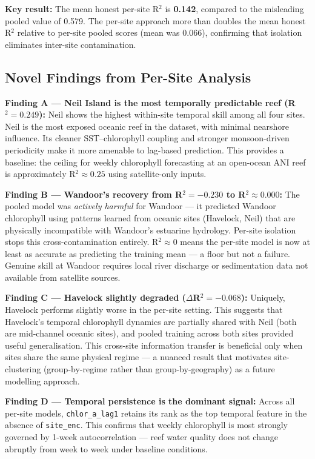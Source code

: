 \documentclass[12pt,a4paper]{report}
\begin{document}
\begin{findingbox}
\textbf{Key result:} The mean honest per-site R$^2$ is \textbf{0.142}, compared to the
misleading pooled value of 0.579. The per-site approach more than doubles the mean
honest R$^2$ relative to per-site pooled scores (mean was 0.066), confirming that
isolation eliminates inter-site contamination.
\end{findingbox}

\subsection{Novel Findings from Per-Site Analysis}

\textbf{Finding A — Neil Island is the most temporally predictable reef (R$^2 = 0.249$):}
Neil shows the highest within-site temporal skill among all four sites. Neil is the
most exposed oceanic reef in the dataset, with minimal nearshore influence. Its cleaner
SST--chlorophyll coupling and stronger monsoon-driven periodicity make it more amenable
to lag-based prediction. This provides a baseline: the ceiling for weekly chlorophyll
forecasting at an open-ocean ANI reef is approximately R$^2 \approx 0.25$ using
satellite-only inputs.

\textbf{Finding B — Wandoor's recovery from R$^2 = -0.230$ to R$^2 \approx 0.000$:}
The pooled model was \textit{actively harmful} for Wandoor — it predicted Wandoor
chlorophyll using patterns learned from oceanic sites (Havelock, Neil) that are
physically incompatible with Wandoor's estuarine hydrology. Per-site isolation stops
this cross-contamination entirely. R$^2 \approx 0$ means the per-site model is now
at least as accurate as predicting the training mean — a floor but not a failure.
Genuine skill at Wandoor requires local river discharge or sedimentation data not
available from satellite sources.

\textbf{Finding C — Havelock slightly degraded ($\Delta$R$^2 = -0.068$):}
Uniquely, Havelock performs slightly worse in the per-site setting. This suggests
that Havelock's temporal chlorophyll dynamics are partially shared with Neil (both
are mid-channel oceanic sites), and pooled training across both sites provided
useful generalisation. This cross-site information transfer is beneficial only when
sites share the same physical regime — a nuanced result that motivates site-clustering
(group-by-regime rather than group-by-geography) as a future modelling approach.

\textbf{Finding D — Temporal persistence is the dominant signal:}
Across all per-site models, \texttt{chlor\_a\_lag1} retains its rank as the top
temporal feature in the absence of \texttt{site\_enc}. This confirms that weekly
chlorophyll is most strongly governed by 1-week autocorrelation — reef water quality
does not change abruptly from week to week under baseline conditions.
\end{document}
